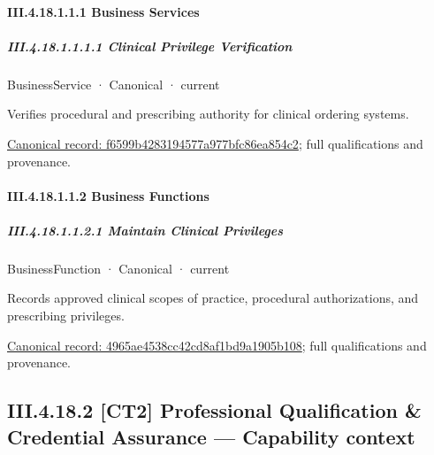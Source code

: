 \paragraph*{III.4.18.1.1.1 Business Services}
\label{navigation:III.4.18.1.1.1}

\subparagraph*{III.4.18.1.1.1.1 Clinical Privilege Verification}
\label{navigation:III.4.18.1.1.1.1}

\label{element:f6599b4283194577a977bfc86ea854c2}
{\small BusinessService · Canonical · current}\par

Verifies procedural and prescribing authority for clinical ordering systems.


{\footnotesize \href{../../../../../../../../continuum/business/business-service/f6599b4283194577a977bfc86ea854c2.md}{Canonical record: f6599b4283194577a977bfc86ea854c2}; full qualifications and provenance.}\par
\paragraph*{III.4.18.1.1.2 Business Functions}
\label{navigation:III.4.18.1.1.2}

\subparagraph*{III.4.18.1.1.2.1 Maintain Clinical Privileges}
\label{navigation:III.4.18.1.1.2.1}

\label{element:4965ae4538cc42cd8af1bd9a1905b108}
{\small BusinessFunction · Canonical · current}\par

Records approved clinical scopes of practice, procedural authorizations, and prescribing privileges.


{\footnotesize \href{../../../../../../../../continuum/business/business-function/4965ae4538cc42cd8af1bd9a1905b108.md}{Canonical record: 4965ae4538cc42cd8af1bd9a1905b108}; full qualifications and provenance.}\par
\subsection*{III.4.18.2 [CT2] Professional Qualification \& Credential Assurance — Capability context}
\label{navigation:III.4.18.2}

